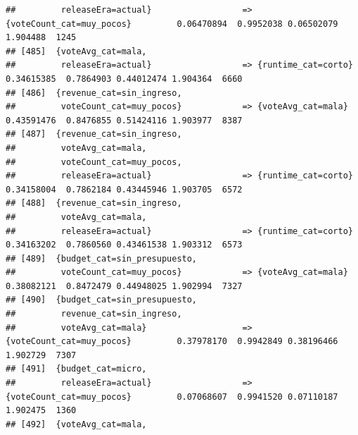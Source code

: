 \documentclass[
]{article}
\begin{document}
\begin{verbatim}
##         releaseEra=actual}                  => {voteCount_cat=muy_pocos}         0.06470894  0.9952038 0.06502079 1.904488  1245
## [485]  {voteAvg_cat=mala,                                                                                                       
##         releaseEra=actual}                  => {runtime_cat=corto}               0.34615385  0.7864903 0.44012474 1.904364  6660
## [486]  {revenue_cat=sin_ingreso,                                                                                                
##         voteCount_cat=muy_pocos}            => {voteAvg_cat=mala}                0.43591476  0.8476855 0.51424116 1.903977  8387
## [487]  {revenue_cat=sin_ingreso,                                                                                                
##         voteAvg_cat=mala,                                                                                                       
##         voteCount_cat=muy_pocos,                                                                                                
##         releaseEra=actual}                  => {runtime_cat=corto}               0.34158004  0.7862184 0.43445946 1.903705  6572
## [488]  {revenue_cat=sin_ingreso,                                                                                                
##         voteAvg_cat=mala,                                                                                                       
##         releaseEra=actual}                  => {runtime_cat=corto}               0.34163202  0.7860560 0.43461538 1.903312  6573
## [489]  {budget_cat=sin_presupuesto,                                                                                             
##         voteCount_cat=muy_pocos}            => {voteAvg_cat=mala}                0.38082121  0.8472479 0.44948025 1.902994  7327
## [490]  {budget_cat=sin_presupuesto,                                                                                             
##         revenue_cat=sin_ingreso,                                                                                                
##         voteAvg_cat=mala}                   => {voteCount_cat=muy_pocos}         0.37978170  0.9942849 0.38196466 1.902729  7307
## [491]  {budget_cat=micro,                                                                                                       
##         releaseEra=actual}                  => {voteCount_cat=muy_pocos}         0.07068607  0.9941520 0.07110187 1.902475  1360
## [492]  {voteAvg_cat=mala,                                                                                                       

\end{verbatim}
\end{document}
